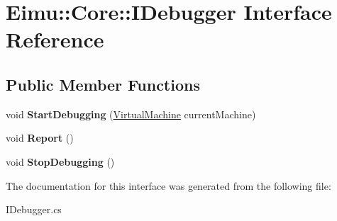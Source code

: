 \hypertarget{interface_eimu_1_1_core_1_1_i_debugger}{
\section{Eimu::Core::IDebugger Interface Reference}
\label{interface_eimu_1_1_core_1_1_i_debugger}
}
\subsection*{Public Member Functions}
\begin{DoxyCompactItemize}
\item 
\hypertarget{interface_eimu_1_1_core_1_1_i_debugger_a9970bf4e22110e4cbc56701e1059af31}{
void {\bfseries StartDebugging} (\hyperlink{class_eimu_1_1_core_1_1_virtual_machine}{VirtualMachine} currentMachine)}
\label{interface_eimu_1_1_core_1_1_i_debugger_a9970bf4e22110e4cbc56701e1059af31}

\item 
\hypertarget{interface_eimu_1_1_core_1_1_i_debugger_a30232c766320b346670f2bea96f6f6f1}{
void {\bfseries Report} ()}
\label{interface_eimu_1_1_core_1_1_i_debugger_a30232c766320b346670f2bea96f6f6f1}

\item 
\hypertarget{interface_eimu_1_1_core_1_1_i_debugger_a3de4ab34b375ebfbfb7af5c06619c0f7}{
void {\bfseries StopDebugging} ()}
\label{interface_eimu_1_1_core_1_1_i_debugger_a3de4ab34b375ebfbfb7af5c06619c0f7}

\end{DoxyCompactItemize}


The documentation for this interface was generated from the following file:\begin{DoxyCompactItemize}
\item 
IDebugger.cs\end{DoxyCompactItemize}
